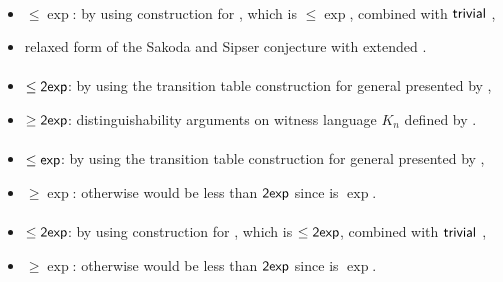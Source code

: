 \paragraph{\TNFA{}\tto\OMODLA}
\begin{itemize}
	\item $\le\exp$: by using construction for \hyperref[cost:2NFAto1DFA]{\TNFA{}\tto\ODFA}, which is $\le\exp$, combined with $\mathsf{trivial}$ \ODFA{}\tto\OMODLA,
	\item relaxed form of the Sakoda and Sipser conjecture with extended \TDFA.
\end{itemize}
\paragraph{\OMOLA{}\tto\ODFA}\label{cost:OM1LAto1DFA}
\begin{itemize}
	\item $\le\mathsf{2exp}$: by using the transition table construction for general \OLA presented by ,
	\item $\ge\mathsf{2exp}$: distinguishability arguments on witness language $K_n$ defined by .
\end{itemize}
\paragraph{\OMOLA{}\tto\ONFA}\label{cost:OM1LAto1NFA}
\begin{itemize}
	\item $\le\mathsf{exp}$: by using the transition table construction for general \OLA presented by ,
	\item $\ge\exp$: otherwise \hyperref[cost:OM1LAto1DFA]{\OMOLA{}\tto\ODFA} would be less than $\mathsf{2exp}$ since \hyperref[cost:1NFAto1DFA]{\ONFA{}\tto\ODFA} is $\exp$.
\end{itemize}
\paragraph{\OMOLA{}\tto\TDFA}
\begin{itemize}
	\item $\le\mathsf{2exp}$: by using construction for \hyperref[cost:OM1LAto1DFA]{\OMOLA{}\tto\ODFA}, which is $\le\mathsf{2exp}$, combined with $\mathsf{trivial}$ \ODFA{}\tto\TDFA,
	\item $\ge\exp$: otherwise \hyperref[cost:OM1LAto1DFA]{\OMOLA{}\tto\ODFA} would be less than $\mathsf{2exp}$ since \hyperref[cost:2DFAto1DFA]{\TDFA{}\tto\ODFA} is $\exp$.
\end{itemize}
